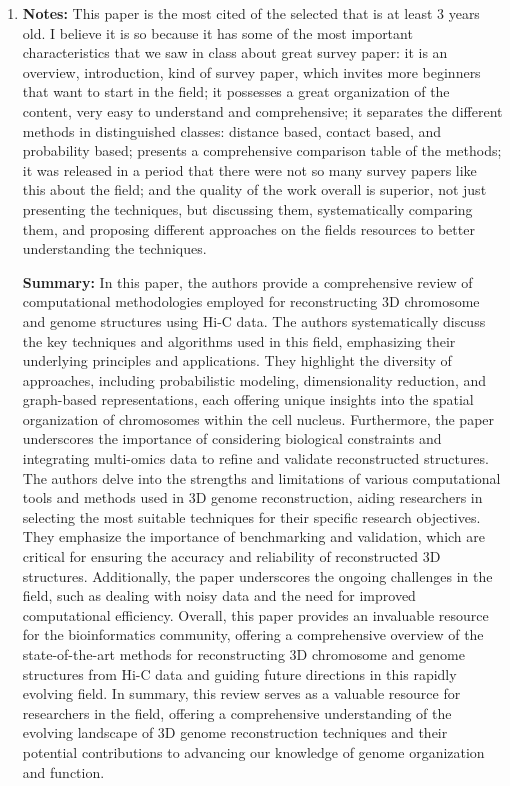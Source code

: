 \begin{enumerate}
    \item \textbf{Notes:} This paper is the most cited of the selected that is at least 3 years old. I believe it is so because it has some of the most important characteristics that we saw in class about great survey paper: it is an overview, introduction, kind of survey paper, which invites more beginners that want to start in the field; it possesses a great organization of the content, very easy to understand and comprehensive; it separates the different methods in distinguished classes: distance based, contact based, and probability based; presents a comprehensive comparison table of the methods; it was released in a period that there were not so many survey papers like this about the field; and the quality of the work overall is superior, not just presenting the techniques, but discussing them, systematically comparing them, and proposing different approaches on the fields resources to better understanding the techniques.
    
    \textbf{Summary:} In this paper, the authors provide a comprehensive review of computational methodologies employed for reconstructing 3D chromosome and genome structures using Hi-C data. The authors systematically discuss the key techniques and algorithms used in this field, emphasizing their underlying principles and applications. They highlight the diversity of approaches, including probabilistic modeling, dimensionality reduction, and graph-based representations, each offering unique insights into the spatial organization of chromosomes within the cell nucleus. Furthermore, the paper underscores the importance of considering biological constraints and integrating multi-omics data to refine and validate reconstructed structures. The authors delve into the strengths and limitations of various computational tools and methods used in 3D genome reconstruction, aiding researchers in selecting the most suitable techniques for their specific research objectives. They emphasize the importance of benchmarking and validation, which are critical for ensuring the accuracy and reliability of reconstructed 3D structures. Additionally, the paper underscores the ongoing challenges in the field, such as dealing with noisy data and the need for improved computational efficiency. Overall, this paper provides an invaluable resource for the bioinformatics community, offering a comprehensive overview of the state-of-the-art methods for reconstructing 3D chromosome and genome structures from Hi-C data and guiding future directions in this rapidly evolving field. In summary, this review serves as a valuable resource for researchers in the field, offering a comprehensive understanding of the evolving landscape of 3D genome reconstruction techniques and their potential contributions to advancing our knowledge of genome organization and function.
    

\end{enumerate}
